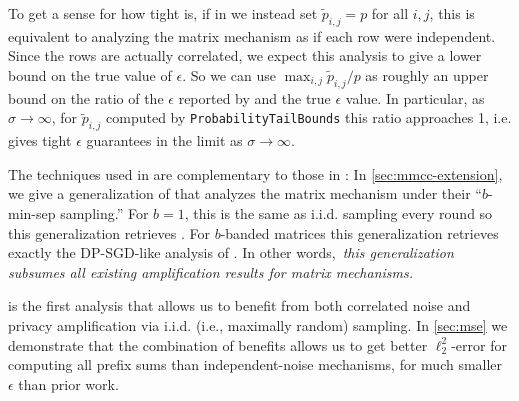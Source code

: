  To get a sense for how tight \MMCC{} is, if in \MMCC{} we instead set $\tilde{p}_{i,j} = p$ for all $i,j$, this is equivalent to analyzing the matrix mechanism as if each row were independent. Since the rows are actually correlated, we expect this analysis to give a lower bound on the true value of $\epsilon$. So we can use $\max_{i,j}\tilde{p}_{i,j} / p$ as roughly an upper bound on the ratio of the $\epsilon$ reported by \CPTB{} and the true $\epsilon$ value. In particular, as $\sigma \rightarrow \infty$, for $\tilde{p}_{i,j}$ computed by \texttt{ProbabilityTailBounds} this ratio approaches 1, i.e. \CPTB{} gives tight $\epsilon$ guarantees in the limit as $\sigma \rightarrow \infty$.

 The techniques used in \MMCC{} are complementary to those in \cite{BandedMF}: In \cref{sec:mmcc-extension}, we give a generalization of \MMCC{} that analyzes the matrix mechanism under their ``$b$-min-sep sampling.'' For $b = 1$, this is the same as i.i.d. sampling every round so this generalization retrieves \MMCC{}. For $b$-banded matrices this generalization retrieves exactly the DP-SGD-like analysis of \cite{BandedMF}. In other words,~\emph{this generalization subsumes all existing amplification results for matrix mechanisms.}

 \MMCC{} is the first analysis that allows us to benefit from both correlated noise and privacy amplification via i.i.d. (i.e., maximally random) sampling. In \cref{sec:mse} we demonstrate that the combination of benefits allows us to get better $\ell_2^2$-error for computing all prefix sums than independent-noise mechanisms, for much smaller $\epsilon$ than prior work. 